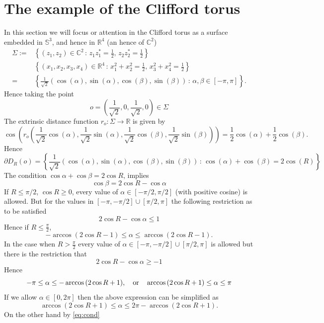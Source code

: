 \documentclass{amsart}
\theoremstyle{definition}
\theoremstyle{remark}
\begin{document}
\section{The example of the Clifford torus}\label{Clifford}
In this section we will focus or attention in the Clifford torus as a surface embedded in $\mathbb{S}^3$, and hence in $\mathbb{R}^4$ (an hence of $\mathbb{C}^2$)
$$
\begin{aligned}
\Sigma:=&\left\lbrace (z_1,z_2)\in\mathbb{C}^2\, :\, z_1z_1^*=\frac{1}{2},\, z_2z_2^*=\frac{1}{2}\right\rbrace\\
&\left\lbrace (x_1,x_2,x_3,x_4)\in\mathbb{R}^4\, :\, x_1^2+x_2^2=\frac{1}{2},\, x_3^2+x_4^2=\frac{1}{2}\right\rbrace\\ 
=&\left\lbrace \frac{1}{\sqrt{2}}\left(\cos(\alpha),\sin(\alpha),\cos(\beta),\sin(\beta)\right)\, :\, \alpha,\beta\in [-\pi,\pi]\right\rbrace. 
\end{aligned}
$$
Hence taking the point
$$
o=\left(\frac{1}{\sqrt{2}},0,\frac{1}{\sqrt{2}},0\right)\in \Sigma
$$
The extrinsic distance function $
r_o:\Sigma\to \mathbb{R}
$
is given by
$$
\cos\left(r_o\left(\frac{1}{\sqrt{2}}\cos(\alpha),\frac{1}{\sqrt{2}}\sin(\alpha),\frac{1}{\sqrt{2}}\cos(\beta),\frac{1}{\sqrt{2}}\sin(\beta)\right)\right)=\frac{1}{2}\cos(\alpha)+\frac{1}{2}\cos(\beta).
$$
Hence 
$$
\partial D_R(o)=\left\lbrace \frac{1}{\sqrt{2}}\left(\cos(\alpha),\sin(\alpha),\cos(\beta),\sin(\beta)\right)\, :\, \cos(\alpha)+\cos(\beta)=2\cos(R)\right\rbrace
$$
The condition $\cos{\alpha}+\cos{\beta}=2\cos{R}$, implies \begin{equation}\label{eq:cond}
\cos{\beta}=2\cos{R}-\cos{\alpha}
\end{equation}
If $R\leq \pi/2$, $\cos{R}\geq 0$, every value of $\alpha\in [-\pi/2, \pi/2]$ (with positive cosine) is allowed. But for the values in $[-\pi, -\pi/2]\cup [\pi/2, \pi]$ the following restriction as to be satisfied 
$$
2\cos{R}-\cos{\alpha}\leq 1
$$
Hence if $R\leq \frac{\pi}{2}$,
$$
-\arccos{\left(2\cos{R}-1\right)}\leq \alpha\leq \arccos{\left(2\cos{R}-1\right)} .
$$
In the case when $R>\frac{\pi}{2}$ every value of $\alpha\in [-\pi,-\pi/2]\cup [\pi/2, \pi]$ is allowed but there is the restriction that
$$
2\cos{R}-\cos{\alpha}\geq -1
$$
Hence 
$$
-\pi \leq \alpha\leq -\arccos{\left(2\cos{R}+1\right)},\quad {\rm or}\quad \arccos{\left(2\cos{R}+1\right)} \leq \alpha\leq \pi 
$$ 
If we allow $\alpha \in [0,2\pi]$ then the above expression can be simplified as
$$
\arccos{\left(2\cos{R}+1\right)} \leq \alpha\leq 2\pi-\arccos{\left(2\cos{R}+1\right)}. 
$$
On the other hand by \eqref{eq:cond} 
\end{document}

